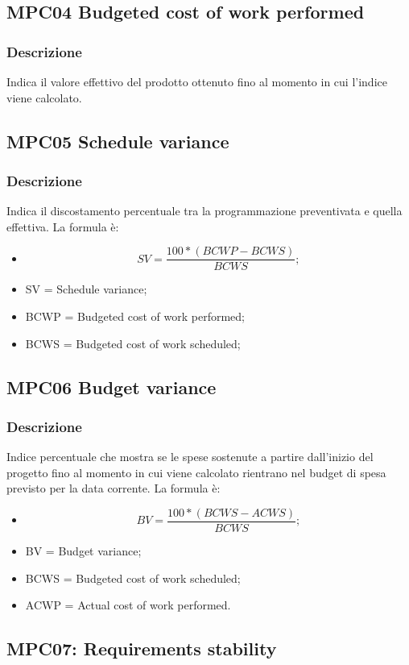 \documentclass[a4paper]{article}
\begin{document}
\subsection{MPC04 Budgeted cost of work performed}
\subsubsection{Descrizione}
Indica il valore effettivo del prodotto ottenuto fino al momento in cui l’indice viene calcolato.

\subsection{MPC05 Schedule variance}
\subsubsection{Descrizione}
Indica il discostamento percentuale tra la programmazione preventivata e quella effettiva.
La formula è:
\begin{itemize}
  \item \[SV =  \frac{100 * (BCWP - BCWS)}{BCWS};\]
  \item SV = Schedule variance;
  \item BCWP = Budgeted cost of work performed;
  \item BCWS = Budgeted cost of work scheduled;
\end{itemize}

\subsection{MPC06 Budget variance}
\subsubsection{Descrizione}
Indice percentuale che mostra se le spese sostenute a partire dall’inizio del progetto fino al momento in cui viene calcolato rientrano nel budget di spesa previsto per la data corrente.
La formula è:
\begin{itemize}
\item \[BV = \frac{100 * (BCWS - ACWS)}{BCWS};\]
\item BV = Budget variance;
\item BCWS = Budgeted cost of work scheduled;
\item ACWP = Actual cost of work performed.
\end{itemize}

\subsection{MPC07: Requirements stability}
\end{document}

